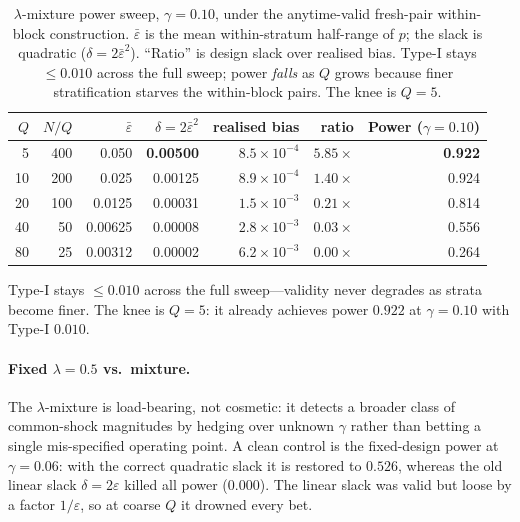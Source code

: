\documentclass{article}
\begin{document}
\begin{table}[h]
  \centering
  \caption{$\lambda$-mixture power sweep, $\gamma=0.10$, under the anytime-valid
  fresh-pair within-block construction. $\bar\varepsilon$ is the mean
  within-stratum half-range of $p$; the slack is quadratic
  ($\delta=2\bar\varepsilon^2$). ``Ratio'' is design slack over realised bias.
  Type-I stays $\le 0.010$ across the full sweep; power \emph{falls} as $Q$
  grows because finer stratification starves the within-block pairs. The knee is
  $Q=5$.}
  \label{tab:power}
  \small
  \begin{tabular}{@{}rrrrrrr@{}}
    \toprule
    $Q$ & $N/Q$ & $\bar\varepsilon$ & $\delta=2\bar\varepsilon^2$ & realised bias & ratio & Power ($\gamma=0.10$) \\
    \midrule
    5  & 400 & 0.050 & \textbf{0.00500} & $8.5\times10^{-4}$ & $5.85\times$ & \textbf{0.922} \\
    10 & 200 & 0.025 & 0.00125 & $8.9\times10^{-4}$ & $1.40\times$ & 0.924 \\
    20 & 100 & 0.0125 & 0.00031 & $1.5\times10^{-3}$ & $0.21\times$ & 0.814 \\
    40 & 50  & 0.00625 & 0.00008 & $2.8\times10^{-3}$ & $0.03\times$ & 0.556 \\
    80 & 25  & 0.00312 & 0.00002 & $6.2\times10^{-3}$ & $0.00\times$ & 0.264 \\
    \bottomrule
  \end{tabular}
\end{table}

Type-I stays $\le 0.010$ across the full sweep---validity never degrades as
strata become finer. The knee is $Q=5$: it already achieves power $0.922$ at
$\gamma=0.10$ with Type-I $0.010$.

\paragraph{Fixed $\lambda=0.5$ vs.\ mixture.}
The $\lambda$-mixture is load-bearing, not cosmetic: it detects a broader class
of common-shock magnitudes by hedging over unknown $\gamma$ rather than betting a
single mis-specified operating point. A clean control is the fixed-design power
at $\gamma=0.06$: with the correct quadratic slack it is restored to $0.526$,
whereas the old linear slack $\delta=2\varepsilon$ killed all power ($0.000$).
The linear slack was valid but loose by a factor $1/\varepsilon$, so at coarse
$Q$ it drowned every bet.
\end{document}
